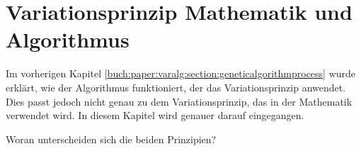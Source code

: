 %
%
%
%
\usepackage{tabularx} %
\section{Variationsprinzip Mathematik und Algorithmus
\label{buch:paper:varalg:section:variations_math_algorithm_result}}
Im vorherigen Kapitel \ref{buch:paper:varalg:section:geneticalgorithmprocess} wurde erklärt, 
wie der Algorithmus funktioniert, der das Variationsprinzip anwendet. Dies 
passt jedoch nicht genau zu dem Variationsprinzip, das in der Mathematik 
verwendet wird. In diesem Kapitel wird genauer darauf eingegangen.

Woran unterscheiden sich die beiden Prinzipien?

